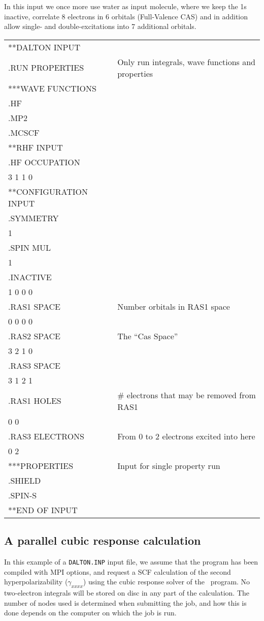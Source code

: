 In this input we once more use water as input molecule,
where we keep
the 1s inactive, correlate 8 electrons in 6 orbitals (Full-Valence
CAS) and in addition allow single- and double-excitations into
7 additional orbitals.

{\ttfamily
\begin{tabular}{ll}
**DALTON INPUT\\
.RUN PROPERTIES\hspace{3cm} & Only run integrals, wave
functions and properties\\
***WAVE FUNCTIONS\\
.HF\\
.MP2\\
.MCSCF\\
**RHF INPUT\\
.HF OCCUPATION\\
 3 1 1 0\\
**CONFIGURATION INPUT\\
.SYMMETRY\\
 1\\
.SPIN MUL\\
 1\\
.INACTIVE\\
 1 0 0 0\\
.RAS1 SPACE & Number orbitals in RAS1 space\\
 0 0 0 0\\
.RAS2 SPACE & The ``Cas Space''\\
 3 2 1 0\\
.RAS3 SPACE\\
 3 1 2 1\\
.RAS1 HOLES & \# electrons that may be removed from RAS1\\
 0 0\\
.RAS3 ELECTRONS & From 0 to 2 electrons excited into here\\
 0 2\\
***PROPERTIES & Input for single property run\\
.SHIELD\\
.SPIN-S\\
**END OF INPUT\\
\end{tabular}}

\subsection{A parallel cubic response calculation}

In this example of a \verb|DALTON.INP| input file, we assume that
the program has been compiled with MPI options, and request a SCF
calculation of the second hyperpolarizability  ($\gamma_{xxxx}$) using
the cubic response solver of the \resp\
program. No two-electron
integrals will be stored on disc in any part of the calculation. The
number of nodes\index{node} used is determined when submitting the
job, and how
this is done depends on the computer on which the job is run.

